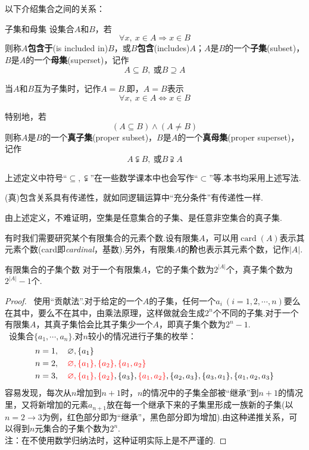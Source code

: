 \documentclass[lang=cn, zihao=5]{elegantbook}
\newcommand{\sw}[1]{\boxed{\text{解法 #1}} \ }
\DeclareMathOperator{\card}{card}
\begin{document}
以下介绍集合之间的关系：

\begin{definition}{子集和母集}
	设集合$A$和$B$，若$$\forall x,~x \in A \Rightarrow x \in B$$则称$A$\textbf{包含于}(is included in)$B$，或$B$\textbf{包含}(includes)$A$；$A$是$B$的一个\textbf{子集}(subset)，$B$是$A$的一个\textbf{母集}(superset)，记作$$A \subseteq B,~ \text{或} B \supseteq A$$
	
	当$A$和$B$互为子集时，记作$A=B$.即，$A=B$表示$$\forall x,~ x \in A \Leftrightarrow x \in B$$
	
	特别地，若$$(A \subseteq B) \wedge (A \neq B)$$则称$A$是$B$的一个\textbf{真子集}(proper subset)，$B$是$A$的一个\textbf{真母集}(proper superset)，记作$$A \subsetneqq B,~ \text{或} B \supsetneqq A$$
\end{definition}
\begin{note}
	上述定义中符号“$\subseteq ,\subsetneqq$”在一些数学课本中也会写作“$\subset$”等.本书均采用上述写法.
\end{note}
\begin{remark}
	(真)包含关系具有传递性，就如同逻辑运算中“充分条件”有传递性一样.
\end{remark}

由上述定义，不难证明，空集是任意集合的子集、是任意非空集合的真子集.

有时我们需要研究某个有限集合的元素个数.设有限集$A$，可以用$\card (A)$表示其元素个数(card即\textit{cardinal}，基数).另外，有限集$A$的\textbf{阶}也表示其元素个数，记作$|A|$.

\begin{proposition}{有限集合的子集个数}
	对于一个有限集$A$，它的子集个数为$2^{|A|}$个，真子集个数为$2^{|A|}-1$个.
\end{proposition}
\begin{proof}
	\sw{一}使用“贡献法”.对于给定的一个$A$的子集，任何一个$a_i~(i=1,2,\cdots ,n)$要么在其中，要么不在其中，由乘法原理，这样做就会生成$2^n$个不同的子集.对于一个有限集$A$，其真子集恰会比其子集少一个$A$，即真子集个数为$2^n-1$. \\
	\sw{二}设集合$\{ a_1, \cdots ,a_n \}$.对$n$较小的情况进行子集的枚举：
	\begin{align*}
		n=1&,\quad \varnothing, \{ a_1 \} \\
		n=2&,\quad \color{red} \varnothing, \{ a_1 \},\{ a_2 \},\{ a_1,a_2 \} \color{black} \\
		n=3&,\quad \color{red} \varnothing, \{ a_1 \},\{ a_2 \}\color{black},\{ a_3 \},\color{red} \{a_1,a_2\} \color{black},\{ a_2,a_3 \},\{ a_3,a_1 \},\{ a_1,a_2,a_3 \}
	\end{align*}
	容易发现，每次从$n$增加到$n+1$时，$n$的情况中的子集全部被“继承”到$n+1$的情况里，又将新增加的元素$a_{n+1}$放在每一个继承下来的子集里形成一族新的子集(以$n=2 \to 3$为例，红色部分即为“继承”，黑色部分即为增加).由这种递推关系，可以得到$n$元集合的子集个数为$2^n$. \\
	注：在不使用数学归纳法时，这种证明实际上是不严谨的.
\end{proof}
\end{document}
